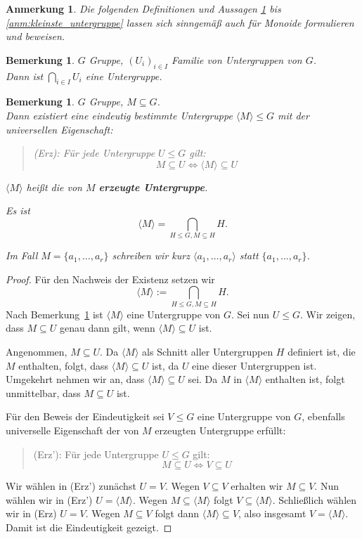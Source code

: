 \documentclass[a4paper, twoside, 11pt, ngerman]{report}
\theoremstyle{definistyle}
\newtheorem{bem}[satz]{Bemerkung}
\newtheorem{anm}[satz]{Anmerkung}
\theoremstyle{remark}
\newcommand{\defn}[1]{\textit{\bfseries #1}}
\begin{document}
\begin{anm}\label{anm:definitionen_128_131}
Die folgenden Definitionen und Aussagen \ref{bem:schnitt_untergruppen} bis \ref{anm:kleinste_untergruppe} lassen sich sinngemäß auch für Monoide formulieren und beweisen.
\end{anm}

\begin{bem}\label{bem:schnitt_untergruppen}
$G$ Gruppe, $(U_i)_{i \in I}$ Familie von Untergruppen von $G$.\\
Dann ist $\bigcap_{i \in I} U_i$ eine Untergruppe.
\end{bem}

\begin{bem}\label{bem:erzeugte_untergruppe}
$G$ Gruppe, $M \subseteq G$.\\
Dann existiert eine eindeutig bestimmte Untergruppe $\langle M \rangle \leq G$ mit der universellen Eigenschaft:
\begin{quote}
(Erz): Für jede Untergruppe $U \leq G$ gilt:
\[
M \subseteq U \iff \langle M \rangle \subseteq U
\]
\end{quote}
$\langle M \rangle$ heißt die von $M$ \defn{erzeugte Untergruppe}.

Es ist \[\langle M \rangle = \bigcap_{H \leq G, M \subseteq H} H.\]

Im Fall $M = \{a_1, \dots, a_r\}$ schreiben wir kurz $\langle a_1, \dots, a_r \rangle$ statt $\{a_1, \dots, a_r\}$.
\end{bem}

\begin{proof}
Für den Nachweis der Existenz setzen wir
\[
\langle M \rangle := \bigcap_{H \leq G, M \subseteq H} H.
\]
Nach Bemerkung~\ref{bem:schnitt_untergruppen} ist $\langle M \rangle$ eine Untergruppe von $G$.
Sei nun $U \leq G$. Wir zeigen, dass $M \subseteq U$ genau dann gilt, wenn $\langle M \rangle \subseteq U$ ist.

Angenommen, $M \subseteq U$. Da $\langle M \rangle$ als Schnitt aller Untergruppen $H$ definiert ist, die $M$ enthalten, folgt, dass $\langle M \rangle \subseteq U$ ist, da $U$ eine dieser Untergruppen ist. Umgekehrt nehmen wir an, dass $\langle M \rangle \subseteq U$ sei. Da $M$ in $\langle M \rangle$ enthalten ist, folgt unmittelbar, dass $M \subseteq U$ ist.

Für den Beweis der Eindeutigkeit sei $V \leq G$ eine Untergruppe von $G$, ebenfalls universelle Eigenschaft der von $M$ erzeugten Untergruppe erfüllt:
\begin{quote}
(Erz'): Für jede Untergruppe $U \leq G$ gilt:
\[
M \subseteq U \iff V \subseteq U
\]
\end{quote}
Wir wählen in (Erz') zunächst $U=V$. Wegen $V\subseteq V$ erhalten wir $M\subseteq V$.
Nun wählen wir in (Erz') $U=\langle M\rangle$. Wegen $M\subseteq\langle M\rangle$ folgt $V\subseteq\langle M\rangle$. Schließlich wählen wir in (Erz) $U=V$. Wegen $M\subseteq V$ folgt dann $\langle M\rangle\subseteq V$, also insgesamt $V=\langle M\rangle$. Damit ist die Eindeutigkeit gezeigt.
\end{proof}
\end{document}
